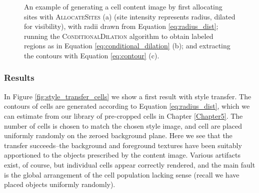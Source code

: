 \begin{figure}%
    \centering
    \qquad
    \qquad
    \caption{An example of generating a cell content image by first allocating sites with \textsc{AllocateSites} (a) (site intensity represents radius, dilated for visibility), with radii drawn from Equation \ref{eq:radius_dist}; running the \textsc{ConditionalDilation} algorithm to obtain labeled regions as in Equation \ref{eq:conditional_dilation} (b); and extracting the contours with Equation \ref{eq:contour} (c).}%
    \label{fig:conditional_dilation_process}
\end{figure}

\subsubsection{Results}

In Figure \ref{fig:style_transfer_cells} we show a first result with style transfer. The contours of cells are generated according to Equation \ref{eq:radius_dist}, which we can estimate from our library of pre-cropped cells in Chapter \ref{Chapter5}. The number of cells is chosen to match the chosen style image, and cell are placed uniformly randomly on the zeroed background plane. Here we see that the transfer succeeds--the background and foreground textures have been suitably apportioned to the objects prescribed by the content image. Various artifacts exist, of course, but individual cells appear correctly rendered, and the main fault is the global arrangement of the cell population lacking sense (recall we have placed objects uniformly randomly).

